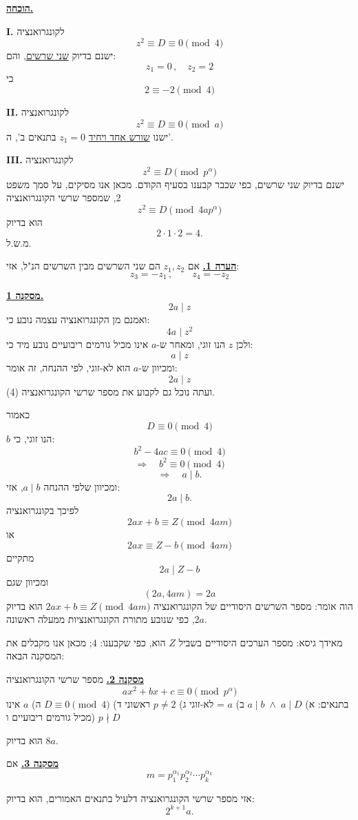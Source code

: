 \noindent\textbf{\underline{הוכחה.}}

\medskip
\noindent\textbf{I.} לקונגרואנציה
\[ z^2 \equiv D \equiv 0 \pmod{4} \]
ישנם בדיוק \underline{שני שרשים}, והם:
\[ z_1 = 0 \, , \quad z_2 = 2 \]
כי
\[ 2 \equiv -2 \pmod{4} \]

\noindent\textbf{II.} לקונגרואנציה
\[ z^2 \equiv D \equiv 0 \pmod{a} \]
ישנו \underline{שורש אחד ויחיד} $z_1 = 0$ בתנאים ב', ה'.

\noindent\textbf{III.} לקונגרואנציה
\[ z^2 \equiv D \pmod{p^{\alpha}} \]
ישנם בדיוק שני שרשים, כפי שכבר קבענו בסעיף הקודם. מכאן אנו מסיקים, על סמך משפט 2, שמספר שרשי הקונגרואנציה
\[ z^2 \equiv D \pmod{4ap^{\alpha}} \]
הוא בדיוק
\[ 2 \cdot 1 \cdot 2 = 4 . \]
\hfill מ.ש.ל.

\bigskip
\noindent\textbf{\underline{הערה 1.}}
אם $z_1, z_2$ הם שני השרשים מבין השרשים הנ"ל, אזי:
\[ z_3 = -z_1 \, , \qquad z_4 = -z_2 \]

\bigskip
\noindent\textbf{\underline{מסקנה 1.}}
\[ 2a \mid z \]
ואמנם מן הקונגרואנציה עצמה נובע כי:
\[ 4a \mid z^2 \]
ולכן $z$ הנו זוגי, ומאחר ש-$a$ אינו מכיל גורמים ריבועיים נובע מיד כי:
\[ a \mid z \]
ומכיוון ש-$a$ הוא לא-זוגי, לפי ההנחה, זה אומר:
\[ 2a \mid z \tag{11} \]
ועתה נוכל גם לקבוע את מספר שרשי הקונגרואנציה (4).

כאמור
\[ D \equiv 0 \pmod{4} \]
$b$ הנו זוגי, כי:
\[ b^2 - 4ac \equiv 0 \pmod{4} \]
\[ \Rightarrow \quad b^2 \equiv 0 \pmod{4} \]
\[ \Rightarrow \quad a \mid b . \]
ומכיוון שלפי ההנחה $a \mid b$, אזי:
\[ 2a \mid b . \tag{12} \]
לפיכך בקונגרואנציה
\[ 2ax + b \equiv Z \pmod{4am} \]
או
\[ 2ax \equiv Z - b \pmod{4am} \]
מתקיים
\[ 2a \mid Z - b \]
ומכיוון שגם
\[ (2a, 4am) = 2a \]
הוה אומר: מספר השרשים היסודיים של הקונגרואנציה $2ax + b \equiv Z \pmod{4am}$ הוא בדיוק $2a$, כפי שנובע מתורת הקונגרואנציות ממעלה ראשונה.

מאידך גיסא: מספר הערכים היסודיים בשביל $Z$ הוא, כפי שקבענו: $4$;
מכאן אנו מקבלים את המסקנה הבאה:

\bigskip
\noindent\textbf{\underline{מסקנה 2.}}
מספר שרשי הקונגרואנציה
\[ ax^2 + bx + c \equiv 0 \pmod{p^{\alpha}} \]
בתנאים:
א) $a \mid b \; \wedge \; a \mid D$
ב) $a$ = לא-זוגי
ג) $p \neq 2$ ראשוני
ד) $D \equiv 0 \pmod{4}$
ה) $a$ אינו מכיל גורמים ריבועיים
ו) $p \nmid D$

הוא בדיוק $8a$.

\bigskip
\noindent\textbf{\underline{מסקנה 3.}}
אם
\[ m = p_1^{\alpha_1} p_2^{\alpha_2} \cdots p_k^{\alpha_k} \]

אזי מספר שרשי הקונגרואנציה דלעיל בתנאים האמורים, הוא בדיוק:
\[ 2^{k+1} a . \]

